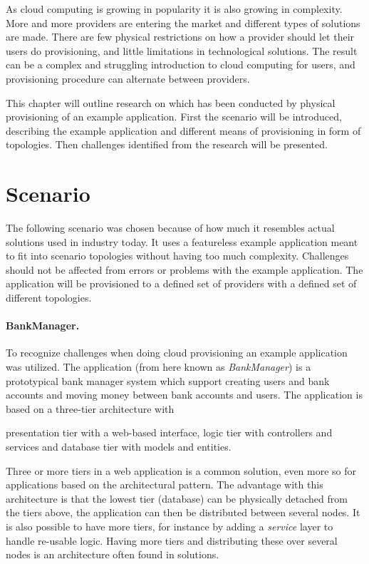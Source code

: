 
As cloud computing is growing in popularity it is also growing in complexity.
More and more providers are entering the market and different types of solutions are made.
There are few physical restrictions on how a provider should let their users do provisioning,
and little limitations in technological solutions.
The result can be a complex and struggling introduction to cloud computing for users,
and provisioning procedure can alternate between providers.

This chapter will outline research on which has been conducted by
physical provisioning of an example application.
First the scenario will be introduced, describing the example application
and different means of provisioning in form of topologies.
Then challenges identified from the research will be presented.

\section{Scenario}

The following scenario was chosen because of how much it resembles actual solutions
used in industry today.
It uses a featureless example application meant to fit into scenario topologies
without having too much complexity.
Challenges should not be affected from errors or problems with the example application.
The application will be provisioned to a defined set of providers with a defined set of different topologies.

\paragraph{BankManager.}

To recognize challenges when doing cloud provisioning an example application~\cite{BankManager} was utilized.
The application (from here known as \emph{BankManager}) is a prototypical bank manager system
which support creating users and bank accounts and moving money between bank accounts and users.
The application is based on a three-tier architecture with 
\begin{ii} 
  \iitem presentation tier with a web-based interface,
  \iitem logic tier with controllers and services and
  \iitem database tier with models and entities.
\end{ii}
Three or more tiers in a web application is a common solution, even more so for applications 
based on the  architectural pattern.
The advantage with this architecture is that the lowest tier (database) can be physically
detached from the tiers above, the application can then be distributed between several nodes.
It is also possible to have more tiers, for instance by adding a \emph{service} 
layer to handle re-usable logic.
Having more tiers and distributing these over several nodes is an architecture often
found in  solutions.


